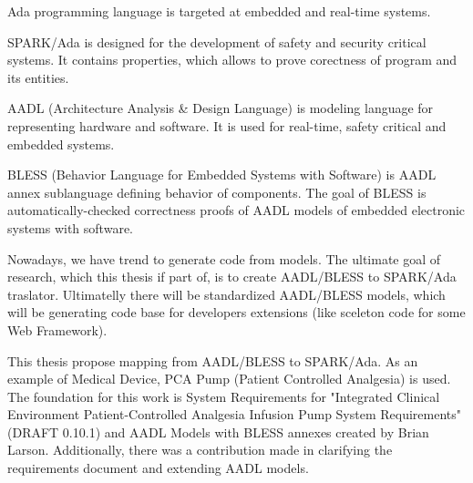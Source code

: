 
\pagestyle{empty}
\setlength{\baselineskip}{0.8cm}




Ada programming language is targeted at embedded and real-time systems.

SPARK/Ada is designed for the development of safety and security critical systems. It contains properties, which allows to prove corectness of program and its entities.


AADL (Architecture Analysis \& Design Language) is modeling language for representing hardware and software. It is used for real-time, safety critical and embedded systems.

BLESS (Behavior Language for Embedded Systems with Software) is AADL annex sublanguage defining behavior of components. The goal of BLESS is automatically-checked correctness proofs of AADL models of embedded electronic systems with software.

Nowadays, we have trend to generate code from models. The ultimate goal of research, which this thesis if part of, is to create AADL/BLESS to SPARK/Ada traslator. Ultimatelly there will be standardized AADL/BLESS models, which will be generating code base for developers extensions (like sceleton code for some Web Framework).

This thesis propose mapping from AADL/BLESS to SPARK/Ada. As an example of Medical Device, PCA Pump (Patient Controlled Analgesia) is used. The foundation for this work is System Requirements for "Integrated Clinical Environment Patient-Controlled Analgesia Infusion Pump System Requirements" (DRAFT 0.10.1) \cite{PcaReq} and AADL Models with BLESS annexes created by Brian Larson. Additionally, there was a contribution made in clarifying the requirements document and extending AADL models.
